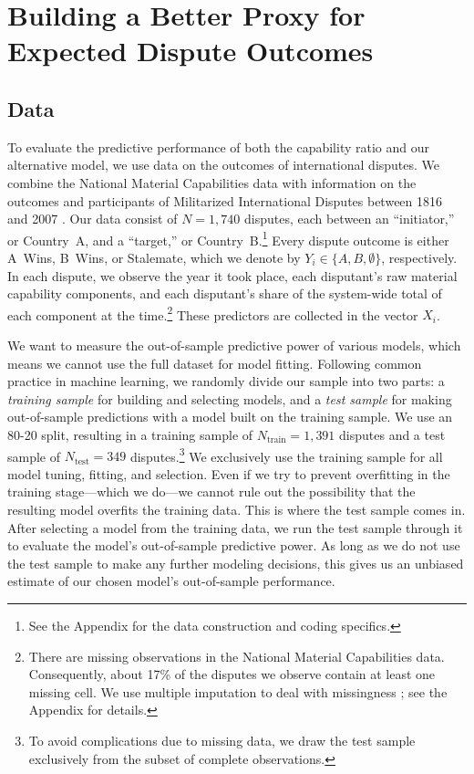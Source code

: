 \section{Building a Better Proxy for Expected Dispute Outcomes}

\subsection{Data}

To evaluate the predictive performance of both the capability ratio and our alternative model, we use data on the outcomes of international disputes.
We combine the National Material Capabilities data \citep{singer1972} with information on the outcomes and participants of Militarized International Disputes between 1816 and 2007 \citep{Palmer:2015hp}.
Our data consist of $N = 1{,}740$ disputes, each between an ``initiator,'' or Country~A, and a ``target,'' or Country~B.\footnote{
  See the Appendix for the data construction and coding specifics.
}
Every dispute outcome is either A~Wins, B~Wins, or Stalemate, which we denote by $Y_i \in \{A, B, \emptyset\}$, respectively.
In each dispute, we observe the year it took place, each disputant's raw material capability components, and each disputant's share of the system-wide total of each component at the time.\footnote{
  There are missing observations in the National Material Capabilities data.
  Consequently, about 17\% of the disputes we observe contain at least one missing cell.
  We use multiple imputation to deal with missingness \citep{honaker_what_2010}; see the Appendix for details.
}
These predictors are collected in the vector $X_i$.

We want to measure the out-of-sample predictive power of various models, which means we cannot use the full dataset for model fitting.
Following common practice in machine learning, we randomly divide our sample into two parts: a \emph{training sample} for building and selecting models, and a \emph{test sample} for making out-of-sample predictions with a model built on the training sample.
We use an 80-20 split, resulting in a training sample of $N_{\text{train}} = 1{,}391$ disputes and a test sample of $N_{\text{test}} = 349$ disputes.\footnote{
  To avoid complications due to missing data, we draw the test sample exclusively from the subset of complete observations.
}
We exclusively use the training sample for all model tuning, fitting, and selection.
Even if we try to prevent overfitting in the training stage---which we do---we cannot rule out the possibility that the resulting model overfits the training data.
This is where the test sample comes in.
After selecting a model from the training data, we run the test sample through it to evaluate the model's out-of-sample predictive power.
As long as we do not use the test sample to make any further modeling decisions, this gives us an unbiased estimate of our chosen model's out-of-sample performance.

